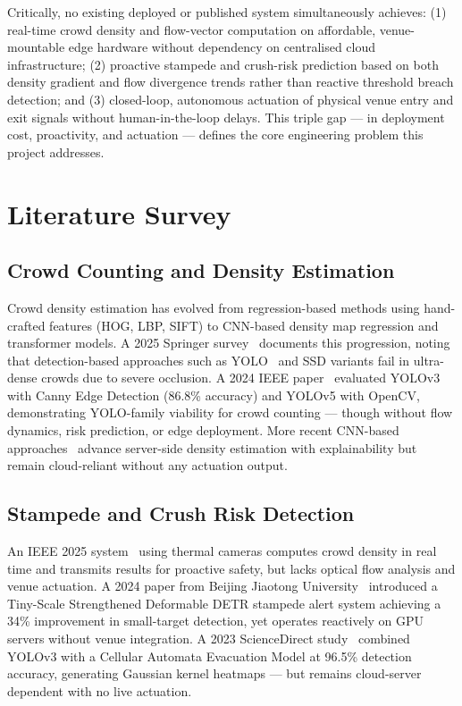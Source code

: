\documentclass[12pt,a4paper]{article}
\begin{document}
Critically, no existing deployed or published system simultaneously achieves: (1) real-time crowd density and flow-vector computation on affordable, venue-mountable edge hardware without dependency on centralised cloud infrastructure; (2) proactive stampede and crush-risk prediction based on both density gradient and flow divergence trends rather than reactive threshold breach detection; and (3) closed-loop, autonomous actuation of physical venue entry and exit signals without human-in-the-loop delays. This triple gap — in deployment cost, proactivity, and actuation — defines the core engineering problem this project addresses.

\section{Literature Survey}

\subsection{Crowd Counting and Density Estimation}

Crowd density estimation has evolved from regression-based methods using hand-crafted features (HOG, LBP, SIFT) to CNN-based density map regression and transformer models. A 2025 Springer survey~\cite{survey2025} documents this progression, noting that detection-based approaches such as YOLO~\cite{yolo} and SSD variants fail in ultra-dense crowds due to severe occlusion. A 2024 IEEE paper~\cite{ieee_yolo_crowd} evaluated YOLOv3 with Canny Edge Detection (86.8\% accuracy) and YOLOv5 with OpenCV, demonstrating YOLO-family viability for crowd counting — though without flow dynamics, risk prediction, or edge deployment. More recent CNN-based approaches~\cite{nature_crowd_cnn,ieee_xai_crowd} advance server-side density estimation with explainability but remain cloud-reliant without any actuation output.

\subsection{Stampede and Crush Risk Detection}

An IEEE 2025 system~\cite{ieee_thermal} using thermal cameras computes crowd density in real time and transmits results for proactive safety, but lacks optical flow analysis and venue actuation. A 2024 paper from Beijing Jiaotong University~\cite{detr_stampede} introduced a Tiny-Scale Strengthened Deformable DETR stampede alert system achieving a 34\% improvement in small-target detection, yet operates reactively on GPU servers without venue integration. A 2023 ScienceDirect study~\cite{caem_2023} combined YOLOv3 with a Cellular Automata Evacuation Model at 96.5\% detection accuracy, generating Gaussian kernel heatmaps — but remains cloud-server dependent with no live actuation.
\end{document}
